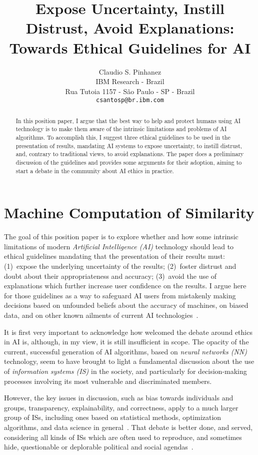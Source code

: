 \documentclass{article}
\title{Expose Uncertainty, Instill Distrust, Avoid Explanations: Towards Ethical Guidelines for AI}
\author{%
  Claudio S. Pinhanez \\
  IBM Research - Brazil\\
  Rua Tutoia 1157 - S\~ao Paulo - SP - Brazil \\
  \texttt{csantosp@br.ibm.com} \\
}
\begin{document}
\maketitle

\begin{abstract}
  In this position paper, I argue that the best way to help and protect humans using AI technology is to make them aware of the intrinsic limitations and problems of AI algorithms. To accomplish this, I suggest three ethical guidelines to be used in the presentation of results, mandating AI systems to expose uncertainty, to instill distrust, and, contrary to traditional views, to avoid explanations. The paper does a preliminary discussion of the guidelines and provides some arguments for their adoption, aiming to start a debate in the community about AI ethics in practice.
\end{abstract}

\section{Machine Computation of Similarity}

The goal of this position paper is to explore whether and how some intrinsic limitations of modern \emph{Artificial Intelligence (AI)} technology should lead to ethical guidelines mandating that the presentation of their results must: (1)~expose the underlying uncertainty of the results; (2)~foster distrust and doubt about their appropriateness and accuracy; (3)~avoid the use of explanations which further increase user confidence on the results. I argue here for those guidelines as a way to safeguard AI users from mistakenly making decisions based on unfounded beliefs about the accuracy of machines, on biased data, and on other known ailments of current AI technologies~\cite{crawford2021atlas}.

It is first very important to acknowledge how welcomed the debate around ethics in AI is, although, in my view, it is still insufficient in scope. The opacity of the current, successful generation of AI algorithms, based on \emph{neural networks (NN)} technology, seem to have brought to light a fundamental discussion about the use of \emph{information systems (IS)} in the society, and particularly for decision-making processes involving its most vulnerable and discriminated members.

However, the key issues in discussion, such as bias towards individuals and groups, transparency, explainability, and correctness, apply to a much larger group of ISs, including ones based on statistical methods, optimization algorithms, and data science in general~\cite{browne2015dark,eubanks2018automating,crawford2021atlas}. That debate is better done, and served, considering all kinds of ISs which are often used to reproduce, and sometimes hide, questionable or deplorable political and social agendas~\cite{browne2015dark,eubanks2018automating,crawford2021atlas}. %
\end{document}
